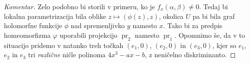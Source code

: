 \documentclass[mat1]{fmfdelo}
\numberwithin{equation}{section}
\DeclareMathOperator{\pr}{pr}
\theoremstyle{definition}
\newenvironment{komentar}[1][Komentar]{\begin{proof}[#1]\let\qed\relax}{\end{proof}}
\begin{document}



\begin{komentar}
    Zelo podobno bi storili v primeru, ko je $f_x(\alpha, \beta) \neq 0$. Tedaj bi lokalna parametrizacija bila oblike $z \mapsto (\phi(z), z)$, okolica $U$ pa bi bila graf holomorfne funkcije $\phi$ nad spremenljivko $y$ namesto $x$. Tako bi za predpis homeomorfizma $\varphi$ uporabili projekcijo $\pr_2$ namesto $\pr_1$. Opomnimo še, da v to situacijo pridemo v natanko treh točkah $(e_1, 0)$, $(e_2, 0)$ in $(e_3, 0)$, kjer so $e_1$, $e_2$ in $e_3$ tri \emph{različne} ničle polinoma $4x^3 - ax - b$, z neničelno diskriminanto.
\end{komentar}
\end{document}
